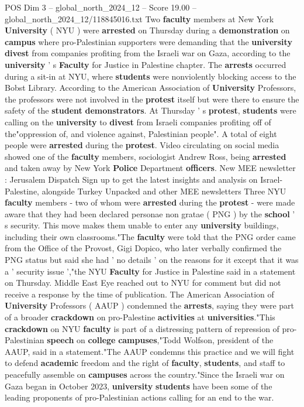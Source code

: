 \begin{textsample}{POS Dim 3 – global\_north\_2024\_12 – Score 19.00 – global\_north\_2024\_12/118845016.txt}  \label{ex:f3_pos_209}
Two \textbf{faculty} members at New York \textbf{University} ( NYU ) were \textbf{arrested} on Thursday during a \textbf{demonstration} on \textbf{campus} where pro-Palestinian supporters were demanding that the \textbf{university} \textbf{divest} from companies profiting from the Israeli war on Gaza, according to the \textbf{university} ' s \textbf{Faculty} for Justice in Palestine chapter.
The \textbf{arrests} occurred during a sit-in at NYU, where \textbf{students} were nonviolently blocking access to the Bobst Library.
According to the American Association of \textbf{University} Professors, the professors were not involved in the \textbf{protest} itself but were there to ensure the safety of the \textbf{student} \textbf{demonstrators}.
At Thursday ' s \textbf{protest}, \textbf{students} were calling on the \textbf{university} to \textbf{divest} from Israeli companies profiting off of the"oppression of, and violence against, Palestinian people".
A total of eight people were \textbf{arrested} during the \textbf{protest}.
Video circulating on social media showed one of the \textbf{faculty} members, sociologist Andrew Ross, being \textbf{arrested} and taken away by New York \textbf{Police} Department \textbf{officers}.
New MEE newsletter : Jerusalem Dispatch Sign up to get the latest insights and analysis on Israel-Palestine, alongside Turkey Unpacked and other MEE newsletters Three NYU \textbf{faculty} members - two of whom were \textbf{arrested} during the \textbf{protest} - were made aware that they had been declared personae non gratae ( PNG ) by the \textbf{school} ' s security.
This move makes them unable to enter any \textbf{university} buildings, including their own classrooms."The \textbf{faculty} were told that the PNG order came from the Office of the Provost, Gigi Dopico, who later verbally confirmed the PNG status but said she had ' no details ' on the reasons for it except that it was a ' security issue ',"the NYU \textbf{Faculty} for Justice in Palestine said in a statement on Thursday.
Middle East Eye reached out to NYU for comment but did not receive a response by the time of publication.
The American Association of \textbf{University} Professors ( AAUP ) condemned the \textbf{arrests}, saying they were part of a broader \textbf{crackdown} on pro-Palestine \textbf{activities} at \textbf{universities}."This \textbf{crackdown} on NYU \textbf{faculty} is part of a distressing pattern of repression of pro-Palestinian \textbf{speech} on \textbf{college} \textbf{campuses},"Todd Wolfson, president of the AAUP, said in a statement."The AAUP condemns this practice and we will fight to defend \textbf{academic} freedom and the right of \textbf{faculty}, \textbf{students}, and staff to peacefully assemble on \textbf{campuses} across the country."Since the Israeli war on Gaza began in October 2023, \textbf{university} \textbf{students} have been some of the leading proponents of pro-Palestinian actions calling for an end to the war.

\end{textsample}
